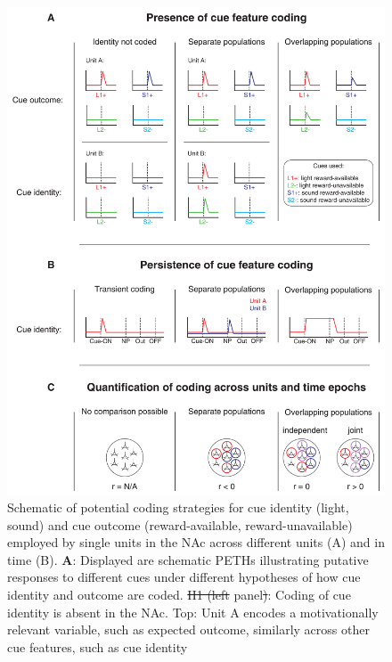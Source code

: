 \documentclass[11pt]{article}
\newcommand{\bsf}[1]{\textbf{#1}}
\providecommand{\DIFadd}[1]{{\protect\color{blue}\uwave{#1}}} %
\providecommand{\DIFdel}[1]{{\protect\color{red}\sout{#1}}}                      %
\providecommand{\DIFaddFL}[1]{\DIFadd{#1}} %
\providecommand{\DIFdelFL}[1]{\DIFdel{#1}} %
\providecommand{\DIFaddbeginFL}{} %
\providecommand{\DIFaddendFL}{} %
\providecommand{\DIFdelbeginFL}{} %
\providecommand{\DIFdelendFL}{} %
\newcommand{\DIFscaledelfig}{0.5}
\newlength{\DIFdelgraphicswidth} %
\newlength{\DIFdelgraphicsheight} %
\newcommand{\DIFaddincludegraphics}[2][]{{\color{blue}\fbox{\DIFOincludegraphics[#1]{#2}}}} %
\newcommand{\DIFdelincludegraphics}[2][]{%
\sbox{\DIFdelgraphicsbox}{\DIFOincludegraphics[#1]{#2}}%
\settoboxwidth{\DIFdelgraphicswidth}{\DIFdelgraphicsbox} %
\settoboxtotalheight{\DIFdelgraphicsheight}{\DIFdelgraphicsbox} %
\scalebox{\DIFscaledelfig}{%
\parbox[b]{\DIFdelgraphicswidth}{\usebox{\DIFdelgraphicsbox}\\[-\baselineskip] \rule{\DIFdelgraphicswidth}{0em}}\llap{\resizebox{\DIFdelgraphicswidth}{\DIFdelgraphicsheight}{%
\setlength{\unitlength}{\DIFdelgraphicswidth}%
\begin{picture}(1,1)%
\thicklines\linethickness{2pt} %
{\color[rgb]{1,0,0}\put(0,0){\framebox(1,1){}}}%
{\color[rgb]{1,0,0}\put(0,0){\line( 1,1){1}}}%
{\color[rgb]{1,0,0}\put(0,1){\line(1,-1){1}}}%
\end{picture}%
}\hspace*{3pt}}} %
} %
\DeclareRobustCommand{\DIFaddbeginFL}{\DIFOaddbeginFL \let\includegraphics\DIFaddincludegraphics} %
\DeclareRobustCommand{\DIFaddendFL}{\DIFOaddendFL \let\includegraphics\DIFOincludegraphics} %
\DeclareRobustCommand{\DIFdelbeginFL}{\DIFOdelbeginFL \let\includegraphics\DIFdelincludegraphics} %
\DeclareRobustCommand{\DIFdelendFL}{\DIFOaddendFL \let\includegraphics\DIFOincludegraphics} %
\begin{document}
 \begin{figure}[ht!]
\centering
\DIFdelbeginFL %
\DIFdelendFL \DIFaddbeginFL \includegraphics[height=0.7\textheight]{Fig 1 - Schematic neural.pdf}
\DIFaddendFL \caption{Schematic of potential coding strategies for cue identity
  (light, sound) and cue outcome (reward-available,
  reward-unavailable) employed by single units in the NAc across
  different units (A) and in time (B). \bsf{A}: Displayed are
  schematic PETHs illustrating putative responses to different cues
  under different hypotheses of how cue identity and outcome are
  coded. \DIFdelbeginFL \DIFdelFL{H1 (left }\DIFdelendFL \DIFaddbeginFL \DIFaddFL{Left }\DIFaddendFL panel\DIFdelbeginFL \DIFdelFL{)}\DIFdelendFL : Coding of cue identity is absent in the NAc. Top:
  Unit A encodes a motivationally relevant variable, such as expected
  outcome, similarly across other cue features, such as cue identity
}
\end{figure}
\end{document}
